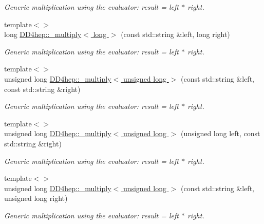 \begin{DoxyCompactItemize}
\begin{DoxyCompactList}\small\item\em Generic multiplication using the evaluator: result = left $\ast$ right. \item\end{DoxyCompactList}\item 
{\footnotesize template$<$$>$ }\\long \hyperlink{group___d_d4_h_e_p___g_e_o_m_e_t_r_y_ga74e3bcc56a765455b68311b0113f10ec}{DD4hep::\_\-multiply$<$ long $>$} (const std::string \&left, long right)
\begin{DoxyCompactList}\small\item\em Generic multiplication using the evaluator: result = left $\ast$ right. \item\end{DoxyCompactList}\item 
{\footnotesize template$<$$>$ }\\unsigned long \hyperlink{group___d_d4_h_e_p___g_e_o_m_e_t_r_y_ga3bf4c1e0a6c9909d8afe54e14db02807}{DD4hep::\_\-multiply$<$ unsigned long $>$} (const std::string \&left, const std::string \&right)
\begin{DoxyCompactList}\small\item\em Generic multiplication using the evaluator: result = left $\ast$ right. \item\end{DoxyCompactList}\item 
{\footnotesize template$<$$>$ }\\unsigned long \hyperlink{group___d_d4_h_e_p___g_e_o_m_e_t_r_y_ga9515f40b1758ccada5e44814fa5ef21a}{DD4hep::\_\-multiply$<$ unsigned long $>$} (unsigned long left, const std::string \&right)
\begin{DoxyCompactList}\small\item\em Generic multiplication using the evaluator: result = left $\ast$ right. \item\end{DoxyCompactList}\item 
{\footnotesize template$<$$>$ }\\unsigned long \hyperlink{group___d_d4_h_e_p___g_e_o_m_e_t_r_y_ga8aa5b607a42dc3d9b9edec97bcdeea04}{DD4hep::\_\-multiply$<$ unsigned long $>$} (const std::string \&left, unsigned long right)
\begin{DoxyCompactList}\small\item\em Generic multiplication using the evaluator: result = left $\ast$ right. \item\end{DoxyCompactList}\item 

\end{DoxyCompactItemize}
